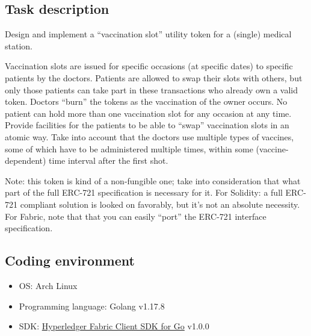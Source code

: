 \subsection{Task description}
Design and implement a “vaccination slot” utility token for a (single) medical station.\par
Vaccination slots are issued for specific occasions (at specific dates) to specific patients by the doctors. Patients are allowed to swap their slots with others, but only those patients can take part in these transactions who already own a valid token. Doctors “burn” the tokens as the vaccination of the owner occurs. No patient can hold more than one vaccination slot for any occasion at any time. Provide facilities for the patients to be able to “swap” vaccination slots in an atomic way. Take into account that the doctors use multiple types of vaccines, some of which have to be administered multiple times, within some (vaccine-dependent) time interval after the first shot.\par
Note: this token is kind of a non-fungible one; take into consideration that what part of the full ERC-721 specification is necessary for it. For Solidity: a full ERC-721 compliant solution is looked on favorably, but it's not an absolute necessity. For Fabric, note that that you can easily “port” the ERC-721 interface specification.

\subsection{Coding environment}
\begin{itemize}
  \item OS: Arch Linux
  \item Programming language: Golang v1.17.8
  \item SDK: \href{https://github.com/hyperledger/fabric-sdk-go}{Hyperledger Fabric Client SDK for Go} v1.0.0
\end{itemize}